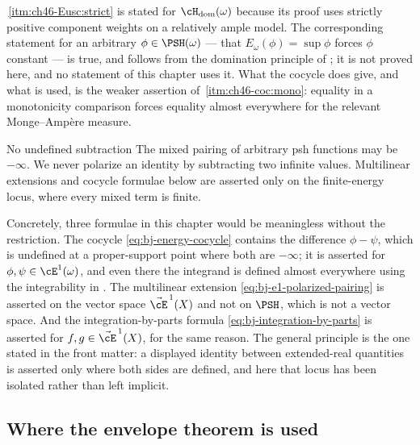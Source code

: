 \begin{remark}
\label{rem:ch46-equality-scope}
\,\cref{itm:ch46-Eusc:strict} is stated for
$\cH_{\mathrm{dom}}(\omega)$ because its proof uses strictly positive
component weights on a relatively ample model.  The corresponding statement
for an arbitrary $\phi\in\PSH(\omega)$ --- that
$E_\omega(\phi)=\sup\phi$ forces $\phi$ constant --- is true, and
follows from the domination principle of
; it is not proved here, and no statement of
this chapter uses it.  What the cocycle does give, and what is used, is the
weaker assertion of \,\cref{itm:ch46-coc:mono}:
equality in a monotonicity comparison forces equality almost everywhere for
the relevant Monge--Amp\`ere measure.
\end{remark}

\begin{warning}{No undefined subtraction}
\label{warn:ch46-no-subtraction}
The mixed pairing of arbitrary psh functions may be $-\infty$.  We never
polarize an identity by subtracting two infinite values.  Multilinear
extensions and cocycle formulae below are asserted only on the finite-energy
locus, where every mixed term is finite.

Concretely, three formulae in this chapter would be meaningless without the
restriction.  The cocycle \eqref{eq:bj-energy-cocycle} contains the
difference $\phi-\psi$, which is undefined at a proper-support point
where both are $-\infty$; it is asserted for
$\phi,\psi\in\cE^1(\omega)$, and even there the integrand is defined
almost everywhere using the integrability in .  The multilinear extension
\eqref{eq:bj-e1-polarized-pairing} is asserted on the vector space
$\vec\cE^{\,1}(X)$ and not on $\PSH$, which is not a vector space.  And
the integration-by-parts formula \eqref{eq:bj-integration-by-parts} is
asserted for $f,g\in\vec\cE^{\,1}(X)$, for the same reason.  The general
principle is the one stated in the front matter: a displayed identity
between extended-real quantities is asserted only where both sides are
defined, and here that locus has been isolated rather than left implicit.
\end{warning}

\subsection{Where the envelope theorem is used}
\label{sec:ch46-where-envelope}

